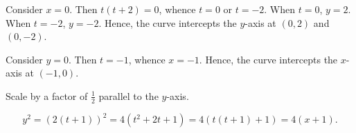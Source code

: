 \begin{solution}
    \begin{ppart}
        Consider $x = 0$. Then $t(t+2) = 0$, whence $t = 0$ or $t = -2$. When $t = 0$, $y = 2$. When $t = -2$, $y = -2$. Hence, the curve intercepts the $y$-axis at $(0, 2)$ and $(0, -2)$.

        Consider $y = 0$. Then $t = -1$, whence $x = -1$. Hence, the curve intercepts the $x$-axis at $(-1, 0)$.
    \end{ppart}
    \begin{ppart}
        \begin{center}
        \end{center}
    \end{ppart}
    \begin{ppart}
        Scale by a factor of $\frac12$ parallel to the $y$-axis.
    \end{ppart}
    \begin{ppart}
        \[y^2 = (2(t+1))^2 = 4(t^2 + 2t + 1) = 4(t(t+1) + 1) = 4(x + 1).\]
    \end{ppart}
\end{solution}